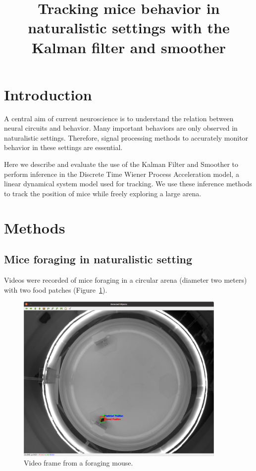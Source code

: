\documentclass[12pt]{article}
\title{Tracking mice behavior in naturalistic settings with the Kalman filter
and smoother}
\author{}
\date{}
\begin{document}
\maketitle

\section{Introduction}

A central aim of current neuroscience is to understand the relation between
neural circuits and behavior. Many important behaviors are only observed in
naturalistic settings.  Therefore, signal processing methods to accurately
monitor behavior in these settings are essential.

Here we describe and evaluate the use of the Kalman Filter and Smoother to
perform inference in the Discrete Time Wiener Process Acceleration model, a
linear dynamical system model used for tracking. We use these inference methods
to track the position of mice while freely exploring a large arena.

\section{Methods}

\subsection{Mice foraging in naturalistic setting}

Videos were recorded of mice foraging in a circular arena (diameter two meters)
with two food patches (Figure~\ref{fig:foragingMouse}).

\begin{figure}
    \begin{center}
        \includegraphics[width=4in]{figures/foraging.png}
        \caption{Video frame from a foraging mouse.}
        \label{fig:foragingMouse}
    \end{center}
\end{figure}
\end{document}
